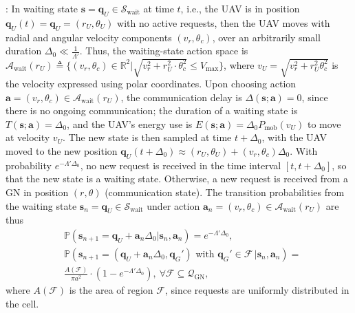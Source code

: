 \documentclass[10pt, twocolumn]{IEEEtran}
\theoremstyle{plain}
\theoremstyle{definition}
\theoremstyle{remark}
\begin{document}
: In waiting state $\mathbf{s}{=}\mathbf{q}_{U}{\in}\mathcal{S}_{\mathrm{wait}}$ at time $t$, i.e., the UAV is in position $\mathbf{q}_{U}(t){=}\mathbf{q}_{U}{=}(r_{U},\theta_{U})$ with no active requests, then the UAV moves with radial and angular velocity components $(v_{r},\theta_{c})$, over an arbitrarily small duration $\Delta_{0}{\ll}\frac{1}{\Lambda'}$. Thus, the waiting-state action space is $\mathcal{A}_{\mathrm{wait}}(r_{U}){\triangleq}\Big\{(v_{r},\theta_{c}){\in}\mathbb{R}^{2}\Big|\sqrt{v_{r}^{2}{+}r_{U}^{2}{\cdot}\theta_{c}^{2}}{\leq}V_{\mathrm{max}} \Big\}$, where $v_{U}{=}\sqrt{v_{r}^{2}{+}r_{U}^{2}\theta_{c}^{2}}$ is the velocity expressed using polar coordinates. Upon choosing action $\mathbf{a}{=}(v_{r},\theta_{c}){\in}\mathcal{A}_{\mathrm{wait}}(r_{U})$, the communication delay is $\Delta(\mathbf{s};\mathbf{a}){=}0$, since there is no ongoing communication; the duration of a waiting state is $T(\mathbf{s};\mathbf{a}){=}\Delta_{0}$, and the UAV's energy use is $E(\mathbf{s};\mathbf{a}){=}\Delta_{0}P_{\mathrm{mob}} \left(v_{U}\right)$ to move at velocity $v_{U}$. The new state is then sampled at time $t{+}\Delta_{0}$, with the UAV moved to the new position $\mathbf{q}_{U}(t{+}\Delta_{0}){\approx}(r_{U},\theta_{U}){+}(v_{r},\theta_{c})\Delta_{0}$. With probability $e^{-\Lambda'\Delta_{0}}$, no new request is received in the time interval $[t,t{+}\Delta_{0}]$, so that the new state is a waiting state.  Otherwise, a new request is received from a GN in position $(r,\theta)$ (communication state). The transition probabilities from the waiting state $\mathbf{s}_{n}{=}\mathbf{q}_{U}{\in}\mathcal{S}_\mathrm{wait}$ under action $\mathbf{a}_{n}{=}(v_{r},\theta_{c}){\in}\mathcal{A}_{\mathrm{wait}}(r_{U})$ are thus
\begin{align}\label{eq:CommTransProb}
    &\mathbb{P}(\mathbf{s}_{n+1} = \mathbf q_U + \mathbf a_n\Delta_0 | \mathbf{s}_n,\mathbf{a}_n) = e^{-\Lambda'\Delta_{0}},\\\nonumber
    &\mathbb{P}(\mathbf{s}_{n+1} = (\mathbf q_U + \mathbf a_n\Delta_0,\mathbf q_G') \text{ with } \mathbf q_G' \in \mathcal{F} \,|\mathbf{s}_n,\mathbf{a}_n) = \\&\frac{A(\mathcal{F})}{\pi a^2} \cdot (1 - e^{-\Lambda'\Delta_{0}}),\ \forall \mathcal{F}\subseteq \mathcal{Q}_{\mathrm{GN}},
\end{align}
where $A(\mathcal{F})$ is the area of region $\mathcal{F}$, since requests are uniformly distributed in the cell.
\end{document}
